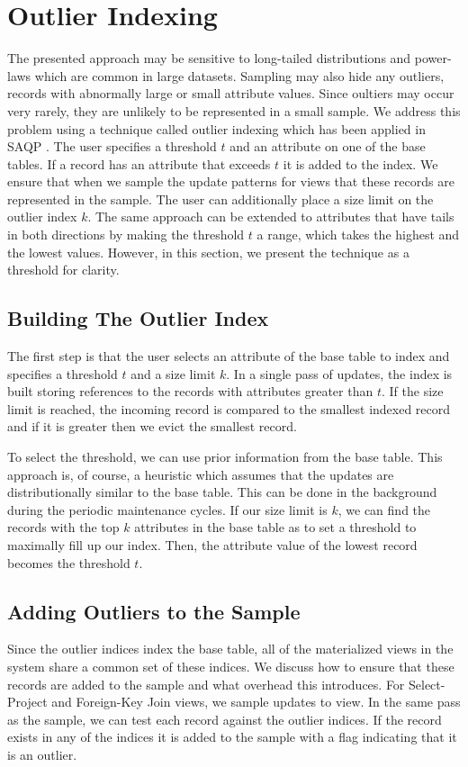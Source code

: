 \section{Outlier Indexing}\label{outlier}
The presented approach may be sensitive to long-tailed distributions and power-laws which are common in large datasets\cite{clauset2009power}.
Sampling may also hide any outliers, records with abnormally large or small attribute values.
Since oultiers may occur very rarely, they are unlikely to be represented in a small sample.
We address this problem using a technique called outlier indexing which has been applied in SAQP \cite{chaudhuri2001overcoming}.
The user specifies a threshold $t$ and an attribute on one of the base tables.
If a record has an attribute that exceeds $t$ it is added to the index.
We ensure that when we sample the update patterns for views that these records are represented in the sample.
The user can additionally place a size limit on the outlier index $k$.
The same approach can be extended to attributes that have tails in both directions by making the threshold $t$ a range, which takes the highest and the lowest values.
However, in this section, we present the technique as a threshold for clarity.

\subsection{Building The Outlier Index}
The first step is that the user selects an attribute of the base table to index and specifies a threshold $t$ and a size limit $k$.
In a single pass of updates, the index is built storing references to the records with attributes greater than $t$.
If the size limit is reached, the incoming record is compared to the smallest indexed record and if it is greater then we evict the smallest record.

To select the threshold, we can use prior information from the base table.
This approach is, of course, a heuristic which assumes that the updates are distributionally similar to the 
base table. 
This can be done in the background during the periodic maintenance cycles.
If our size limit is $k$, we can find the records with the top $k$ attributes in the base table as to set a threshold to maximally fill up our index. 
Then, the attribute value of the lowest record becomes the threshold $t$.

\subsection{Adding Outliers to the Sample}
Since the outlier indices index the base table, all of the materialized views in the system share a common set of these indices.
We discuss how to ensure that these records are added to the sample and what overhead this introduces.
For Select-Project and Foreign-Key Join views, we sample updates to view.
In the same pass as the sample, we can test each record against the outlier indices. 
If the record exists in any of the indices it is added to the sample with a flag indicating that it is an outlier.

